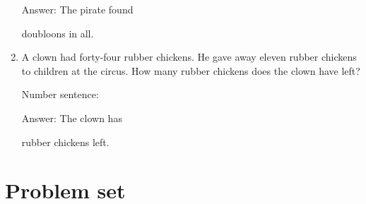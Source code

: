 \documentclass{tufte-book}
\begin{document}
\begin{enumerate}
  Answer: The pirate found
  \dotfill\medskip\par\mbox{}\dotfill\medskip\par\mbox{}\dotfill\bigskip
  doubloons in all.
\item
  A clown had forty-four rubber chickens. He gave away eleven rubber
  chickens to children at the circus. How many rubber chickens does the
  clown have left?\medskip\par
  Number sentence:
  \dotfill\medskip\par
  Answer: The clown has
  \dotfill\medskip\par\mbox{}\dotfill\medskip\par\mbox{}\dotfill\bigskip
  rubber chickens left.
\end{enumerate}



\clearpage\section{Problem set }
\end{document}
